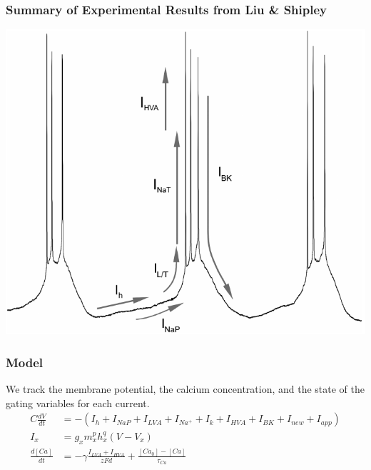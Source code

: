 \documentclass{beamer}
\theoremstyle{plain}
\theoremstyle{definition}
\begin{document}
\begin{frame}\frametitle{Summary of Experimental Results from Liu \& Shipley \cite{liu_multiple_2008}}
  \begin{center}
    \includegraphics[scale = .33]{summary.png}
  \end{center}
\end{frame}

 \begin{frame}\frametitle{Model}
 We track the membrane potential, the calcium concentration, and the state of the gating variables for each current.
 \begin{align*}
   C\frac{dV}{dt} &= -(I_h + I_{NaP} + I_{LVA} + I_{Na^+} + I_k + I_{HVA} + I_{BK} + I_{new} + I_{app})\\[1em]
   I_x &= g_xm_x^ph_x^q(V - V_x)\\[1em]
   \frac{d[Ca]}{dt} &= -\gamma\frac{I_{LVA} + I_{HVA}}{zFd} + \frac{[Ca_0] - [Ca]}{\tau_{Ca}}
 \end{align*}
 \end{frame}

\end{document}
